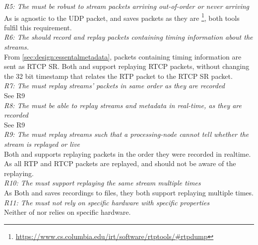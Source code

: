 \noindent\textit{R5: The  must be robust to stream packets arriving out-of-order or never arriving}\\
As  is agnostic to the UDP packet, and  saves packets as they are \footnote{\url{https://www.cs.columbia.edu/irt/software/rtptools/\#rtpdump}}, both tools fulfil this requirement.\\

\noindent\textit{R6: The \hist{} should record and replay packets containing timing information about the streams.}\\
From \ref{sec:design:essentalmetadata}, packets containing timing information are sent as RTCP SR.
Both  and  support replaying RTCP packets, without changing the 32 bit timestamp that relates the RTP packet to the RTCP SR packet.\\

\noindent\textit{R7: The  must replay streams' packets in same order as they are recorded}\\
See R9\\

\noindent\textit{R8: The  must be able to replay streams and metadata in real-time, as they are recorded}\\
See R9\\

\noindent\textit{R9: The  must replay streams such that a processing-node cannot tell whether the stream is replayed or live}\\
Both  and  supports replaying packets in the order they were recorded in realtime. As all RTP and RTCP packets are replayed, \subs{} and \pubs{} should not be aware of the replaying.\\

\noindent\textit{R10: The  must support replaying the same stream multiple times}\\
As Both  and  saves recordings to files, they both support replaying multiple times.\\

\noindent\textit{R11: The  must not rely on specific hardware with specific properties}\\
Neither of  nor  relies on specific hardware.\\

